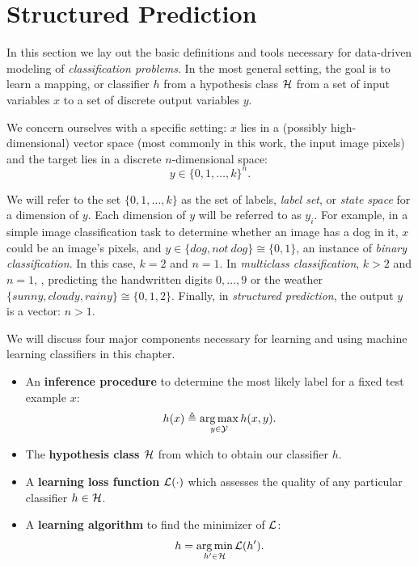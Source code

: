 \chapter{Structured Prediction}\label{sec:ml}

In this section we lay out the basic definitions and tools necessary for 
data-driven modeling of {\em classification problems}.  In the most general 
setting, the goal is to learn a mapping, or classifier $h$ from a hypothesis 
class $\mathcal{H}$ from a set of input variables $x$ to a set of discrete output 
variables $y$.   

We concern ourselves with a specific setting: $x$ lies in a (possibly 
high-dimensional) vector space (most commonly in this work, the input image 
pixels) and the target lies in a discrete $n$-dimensional space: 
$$y \in \{0,1,\ldots,k\}^n.$$  

We will refer to the set $\{0,1,\ldots,k\}$ as the set of labels, {\em label 
set}, or {\em state space} for a dimension of $y$.  Each dimension of $y$ will 
be referred to as $y_i$.  For example, in a simple image classification task to 
determine whether an image has a dog in it, $x$ could be an image's pixels, and 
$y \in \{dog, not~dog\} \cong \{0,1\} $, an instance of {\em binary 
classification}. In this case, $k = 2$ and $n 
= 1$.  In {\em multiclass classification}, $k>2$ and $n = 1$, \eg, predicting 
the handwritten digits $0,\dots,9$ or the weather $\{sunny, cloudy, rainy\} 
\cong \{0,1,2\}$.  Finally, in {\em structured prediction}, the output $y$ is a 
vector: $n > 1$.

We will discuss four major components necessary for learning and using machine 
learning classifiers in this chapter.

\begin{itemize}
\item An {\bf inference procedure} to determine the most likely label for a 
fixed test example $x$: \begin{equation}
h(x) \triangleq \mathop{\arg\max}_{y \in \mathcal{Y}} h(x,y).
\end{equation}
\item The {\bf hypothesis class $\mathcal{H}$} from which to obtain our classifier $h$.
\item  A {\bf learning loss function} $\mathcal{L}(\cdot)$ which assesses the quality 
of any particular classifier $h \in \mathcal{H}$.
\item A {\bf learning algorithm} to find the minimizer of $\mathcal{L}$: 
\begin{equation}
h = \mathop{\arg\min}_{h' \in \mathcal{H}} \mathcal{L}(h').
\end{equation}
\end{itemize}


